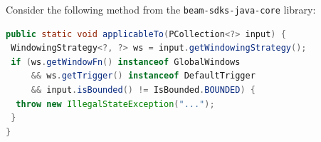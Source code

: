 



Consider the following method from the \texttt{beam-sdks-java-core} library:

\begin{lstlisting}[language=Java,breaklines=true,breakatwhitespace=false,basicstyle=\scriptsize\ttfamily]
public static void applicableTo(PCollection<?> input) {
 WindowingStrategy<?, ?> ws = input.getWindowingStrategy();
 if (ws.getWindowFn() instanceof GlobalWindows
     && ws.getTrigger() instanceof DefaultTrigger
     && input.isBounded() != IsBounded.BOUNDED) {
  throw new IllegalStateException("...");
 }
}
\end{lstlisting}


